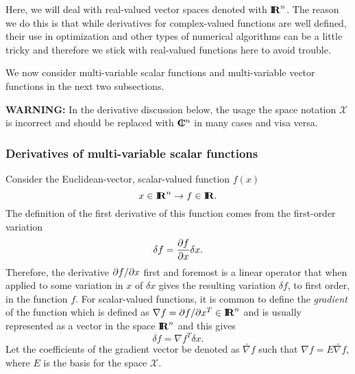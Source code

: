 Here, we will deal with real-valued vector spaces denoted with $\mbox{\textbf{I}}\hspace{-0.6ex}\mbox{\textbf{R}}^n$.  The
reason we do this is that while derivatives for complex-valued functions are
well defined, their use in optimization and other types of numerical
algorithms can be a little tricky and therefore we stick with real-valued
functions here to avoid trouble.

We now consider multi-variable scalar functions and multi-variable vector
functions in the next two subsections.

{}\textbf{WARNING:} In the derivative discussion below, the usage the space
notation $\mathcal{X}$ is incorrect and should be replaced with $\mbox{\textbf{C}}\hspace{-1.1ex}\mbox{l}\hspace{0.4ex}^n$ in
many cases and visa versa.

\subsubsection{Derivatives of multi-variable scalar functions}
\label{sec:scalar_function_derivatives}
 
Consider the Euclidean-vector, scalar-valued function $f(x)$
\[
x\in\mbox{\textbf{I}}\hspace{-0.6ex}\mbox{\textbf{R}}^n \rightarrow f\in\mbox{\textbf{I}}\hspace{-0.6ex}\mbox{\textbf{R}}.
\]
The definition of the first derivative of this function comes from the
first-order variation
\[
\delta f = \displaystyle{\frac{\partial f}{\partial x}} \delta x.
\]
Therefore, the derivative $\partial f / \partial x$ first and foremost is a linear operator
that when applied to some variation in $x$ of $\delta x$ gives the resulting
variation $\delta f$, to first order, in the function $f$.  For scalar-valued
functions, it is common to define the {}\textit{gradient} of the function
which is defined as $\nabla f = \partial f / \partial x^T {}\in \mbox{\textbf{I}}\hspace{-0.6ex}\mbox{\textbf{R}}^n$ and is usually
represented as a vector in the space $\mbox{\textbf{I}}\hspace{-0.6ex}\mbox{\textbf{R}}^n$ and this gives
\[
\delta f = {\nabla f}^T \delta x.
\]
Let the coefficients of the gradient vector be denoted as $\tilde{\nabla f}$
such that $\nabla f = E {}\tilde{\nabla f}$, where $E$ is the basis for the
space $\mathcal{X}$.

